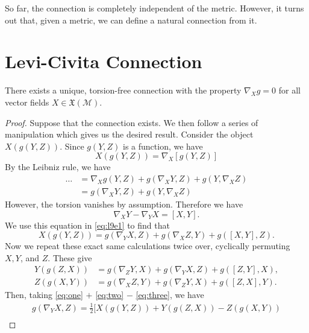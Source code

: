 So far, the connection is completely independent of the metric. However, it turns out that, given a metric, we can define a natural connection from it.

\section{Levi-Civita Connection}%
\label{sec:levi_civita_connection}

\begin{theorem}
  There exists a unique, torsion-free connection with the property $\nabla_{X} g = 0$ for all vector fields $X \in \mathfrak{X}(\mathcal{M})$.
\end{theorem}
\begin{proof}
  Suppose that the connection exists.
  We then follow a series of manipulation which gives us the desired result.
  Consider the object $X(g(Y, Z))$. Since $g(Y, Z)$ is a function, we have
  \begin{equation}
    X(g(Y,Z)) = \nabla_{X} [g(Y, Z)]
  \end{equation}
  By the Leibniz rule, we have
  \begin{align}
    \dots &= \nabla_{X} g(Y, Z) + g(\nabla_{X}Y, Z) + g(Y, \nabla_{X}Z) \\
	  &= g(\nabla_{X}Y, Z) + g(Y, \nabla_{X}Z) \label{eq:l9e1}
  \end{align}
  However, the torsion vanishes by assumption. Therefore we have
  \begin{equation}
    \nabla_{X}Y - \nabla_{Y}X = [X, Y].
  \end{equation} 
  We use this equation in \eqref{eq:l9e1} to find that
  \begin{equation}
    \label{eq:one}
    X(g(Y, Z)) = g(\nabla_{Y} X, Z ) + g(\nabla_{X} Z , Y) + g([X, Y], Z).
  \end{equation}
  Now we repeat these exact same calculations twice over, cyclically permuting $X, Y$, and $Z$. These give
  \begin{align}
    \label{eq:two}
    Y(g(Z, X)) &= g(\nabla_{Z} Y, X ) + g(\nabla_{Y} X , Z) + g([Z, Y], X), \\
    \label{eq:three}
    Z(g(X, Y)) &= g(\nabla_{X} Z, Y ) + g(\nabla_{Z} Y , X) + g([Z, X], Y).
  \end{align}
  Then, taking \eqref{eq:one} $+$ \eqref{eq:two} $-$ \eqref{eq:three}, we have
  \begin{multline}
    g(\nabla_{Y}X, Z) = \frac{1}{2} \bigl[ X(g(Y,Z) ) + Y(g(Z, X)) - Z(g(X,Y)) \\

\end{multline}
\end{proof}
